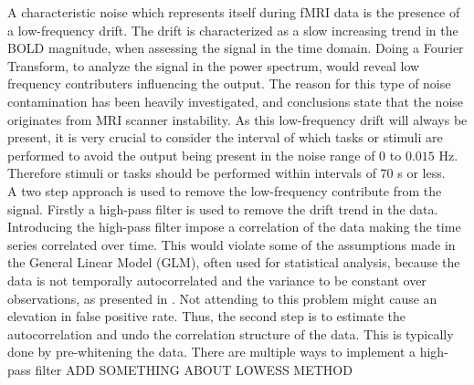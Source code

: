 A characteristic noise which represents itself during fMRI data is the presence of a low-frequency drift. The drift is characterized as a slow increasing trend in the BOLD magnitude, when assessing the signal in the time domain. Doing a Fourier Transform, to analyze the signal in the power spectrum, would reveal low frequency contributers influencing the output. The reason for this type of noise contamination has been heavily investigated, and conclusions state that the noise originates from MRI scanner instability. As this low-frequency drift will always be present, it is very crucial to consider the interval of which tasks or stimuli are performed to avoid the output being present in the noise range of $0$ to $0.015$ Hz. Therefore stimuli or tasks should be performed within intervals of $70$ s or less. \cite{Poldrack2011} \\
A two step approach is used to remove the low-frequency contribute from the signal. Firstly a high-pass filter is used to remove the drift trend in the data. Introducing the high-pass filter impose a correlation of the data making the time series correlated over time. This would violate some of the assumptions made in the General Linear Model (GLM), often used for statistical analysis, because the data is not temporally autocorrelated and the variance to be constant over observations, as presented in . Not attending to this problem might cause an elevation in false positive rate. Thus, the second step is to estimate the autocorrelation and undo the correlation structure of the data. This is typically done by pre-whitening the data. There are multiple ways to implement a high-pass filter ADD SOMETHING ABOUT LOWESS METHOD \cite{Poldrack2011}